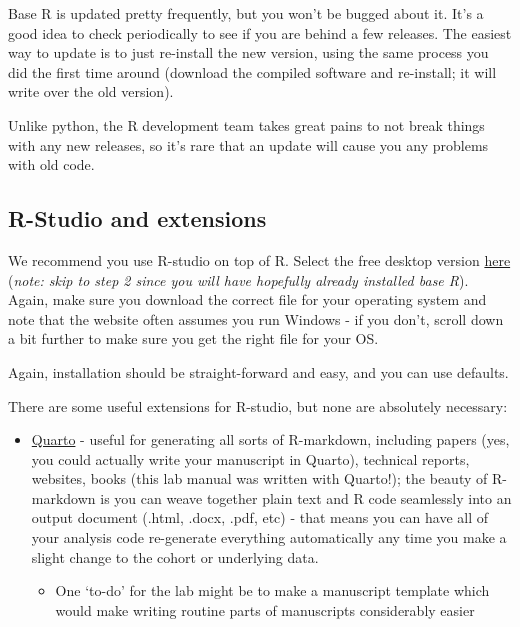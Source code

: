 \documentclass[
  letterpaper,
  DIV=11,
  numbers=noendperiod]{scrreprt}
\providecommand{\tightlist}{%
  \setlength{\itemsep}{0pt}\setlength{\parskip}{0pt}}\usepackage{longtable,booktabs,array}
\begin{document}
\begin{tcolorbox}[enhanced jigsaw, colframe=quarto-callout-tip-color-frame, opacityback=0, leftrule=.75mm, bottomrule=.15mm, rightrule=.15mm, left=2mm, toptitle=1mm, colback=white, bottomtitle=1mm, titlerule=0mm, title=\textcolor{quarto-callout-tip-color}{\faLightbulb}\hspace{0.5em}{Tip}, arc=.35mm, toprule=.15mm, breakable, coltitle=black, colbacktitle=quarto-callout-tip-color!10!white, opacitybacktitle=0.6]

Base R is updated pretty frequently, but you won't be bugged about it.
It's a good idea to check periodically to see if you are behind a few
releases. The easiest way to update is to just re-install the new
version, using the same process you did the first time around (download
the compiled software and re-install; it will write over the old
version).

Unlike python, the R development team takes great pains to not break
things with any new releases, so it's rare that an update will cause you
any problems with old code.

\end{tcolorbox}

\hypertarget{r-studio-and-extensions}{%
\subsection{R-Studio and extensions}\label{r-studio-and-extensions}}

We recommend you use R-studio on top of R. Select the free desktop
version \href{https://posit.co/download/rstudio-desktop/}{here}
(\emph{note: skip to step 2 since you will have hopefully already
installed base R}). Again, make sure you download the correct file for
your operating system and note that the website often assumes you run
Windows - if you don't, scroll down a bit further to make sure you get
the right file for your OS.

Again, installation should be straight-forward and easy, and you can use
defaults.

There are some useful extensions for R-studio, but none are absolutely
necessary:

\begin{itemize}
\tightlist
\item
  \href{https://quarto.org/}{Quarto} - useful for generating all sorts
  of R-markdown, including papers (yes, you could actually write your
  manuscript in Quarto), technical reports, websites, books (this lab
  manual was written with Quarto!); the beauty of R-markdown is you can
  weave together plain text and R code seamlessly into an output
  document (.html, .docx, .pdf, etc) - that means you can have all of
  your analysis code re-generate everything automatically any time you
  make a slight change to the cohort or underlying data.

  \begin{itemize}
  \tightlist
  \item
    One `to-do' for the lab might be to make a manuscript template which
    would make writing routine parts of manuscripts considerably easier
    🤔
  \end{itemize}
\end{itemize}
\end{document}
